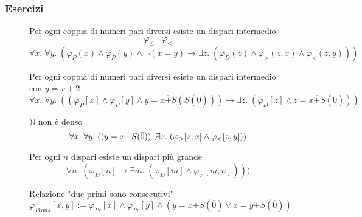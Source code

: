 \documentclass{article}
\theoremstyle{break}
\theoremstyle{break}
\theoremstyle{break}
\theoremstyle{break}
\begin{document}
  \subsubsection{Esercizi}
  \begin{figure}[H]
    \begin{exercise}
      Per ogni coppia di numeri pari diversi esiste un dispari intermedio
      \[
        \varphi_{\le} \;\;\; \varphi_{<}
      \] 
      \[
        \forall x.\; \forall y.\; (\varphi_{P}(x) \wedge \varphi_{P}(y) \wedge \neg(x = y) \to \exists z.\; (\varphi_{D}(z) \wedge \varphi_{>}(z,x) \wedge \varphi_{<}(z,y)))
      \] 
    \end{exercise}
  \end{figure}
  \begin{figure}[H]
    \begin{exercise}    Per ogni coppia di numeri pari diversi esiste un dispari intermedio con \( y=x+2 \) 
      \[
        \forall x.\; \forall y.\; ((\varphi_{P}[x] \wedge \varphi_{P}[y] \wedge y = x \overline{+} S(S(\overline{0}))) \to \exists z.\; (\varphi_{D}[z] \wedge z = x \overline{+} S(\overline{0})))
      \] 
    \end{exercise}
  \end{figure}
  \begin{figure}[H]
    \begin{exercise}
      \( \mathbb{N} \) non è denso
      \[
        \forall x.\; \forall y.\; ((y = x \overline{+} S(\overline{0})) \not\exists z.\; (\varphi_{>}[z,x] \wedge \varphi_{<}[z,y]))
      \] 
    \end{exercise}
  \end{figure}

  \begin{figure}[H]
    \begin{exercise}
      Per ogni \( n \) dispari esiste un dispari più grande
      \[
        \forall n.\; (\varphi_{D}[n] \to \exists m.\; (\varphi_{D}[m] \wedge \varphi_{>}[m,n])))
      \] 
    \end{exercise}
  \end{figure}

  \begin{figure}[H]
    \begin{exercise}
      Relazione "due primi sono consecutivi"
      \[
        \varphi_{Pcons}[x,y] := \varphi_{Pr}[x] \wedge \varphi_{Pr}[y] \wedge (y = x \overline{+} S(\overline{0}) \vee x = y \overline{+} S(\overline{0}) )
      \] 
    \end{exercise}
  \end{figure}
\end{document}
